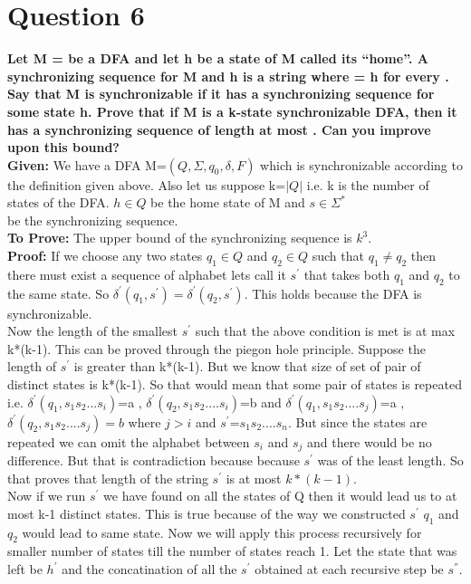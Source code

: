 \documentclass{article}
\begin{document}
\section{Question 6}
\textbf{Let M =  be a DFA and let h be a state of M called its “home”. A synchronizing
sequence for M and h is a string  where  = h for every . Say that M
is synchronizable if it has a synchronizing sequence for some state h. Prove that if M is a
k-state synchronizable DFA, then it has a synchronizing sequence of length at most  . Can you improve upon this bound?} \\
\newline
\textbf{Given:} We have a DFA M=$(Q, \Sigma, q_0 , \delta, F )$ which is synchronizable according to the definition given above. Also let us suppose k=$|Q|$ i.e. k is the number of states of the DFA. $h\in Q$ be the home state of M and $s\in\Sigma^{*}$\\ be the synchronizing sequence.\\ 
\textbf{To Prove:} The upper bound of the synchronizing sequence is $k^3$.\\
\textbf{Proof:} If we choose any two states $q_1\in Q$ and $q_2\in Q$ such that $q_1 \neq q_2$ then there must exist a sequence of alphabet lets call it $s^{'}$ that takes both $q_1$ and $q_2$ to the same state. So $\delta^{'}(q_1,s^{'})=\delta^{'}(q_2,s^{'})$. This holds because the DFA is synchronizable.\\
Now the length of the smallest $s^{'}$ such that the above condition is met is at max k*(k-1). This can be proved through the piegon hole principle. Suppose the length of $s^{'}$ is greater than k*(k-1). But we know that size of set of pair of distinct states is k*(k-1). So that would mean that some pair of states is repeated i.e. $\delta^{'}(q_1,s_1s_2...s_i)$=a , $\delta^{'}(q_2,s_1s_2....s_i)$=b and $\delta^{'}(q_1,s_1s_2....s_j)$=a , $\delta^{'}(q_2,s_1s_2....s_j)=b$ where $j>i$ and $s^{'}$=$s_1s_2....s_n$. But since the states are repeated we can omit the alphabet between $s_i$ and $s_j$ and there would be no difference. But that is contradiction because because $s^{'}$ was of the least length. So that proves that length of the string $s^{'}$ is at most $k*(k-1)$. \\
Now if we run $s^{'}$ we have found on all the states of Q then it would lead us to at most k-1 distinct states. This is true because of the way we constructed $s^{'}$ $q_1$ and $q_2$ would lead to same state. Now we will apply this process recursively for smaller number of states till the number of states reach 1. Let the state that was left be $h^{'}$ and the concatination of all the $s^{'}$ obtained  at each recursive step be $s^{''}$. \\
\end{document}
